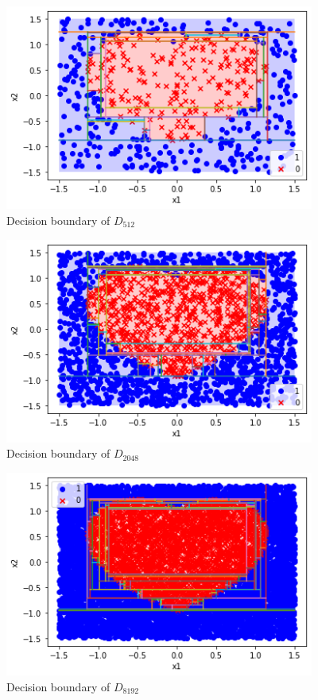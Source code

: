 \documentclass[a4paper]{article}
\theoremstyle{definition}
\begin{document}
\begin{figure}[htbp]
\centering
\includegraphics[width=4in]{Q7-3.png}
\caption{Decision boundary of $D_{512}$}
\label{Q7-3}
\end{figure}

\begin{figure}[htbp]
\centering
\includegraphics[width=4in]{Q7-4.png}
\caption{Decision boundary of $D_{2048}$}
\label{Q7-4}
\end{figure}

\begin{figure}[htbp]
\centering
\includegraphics[width=4in]{Q7-5.png}
\caption{Decision boundary of $D_{8192}$}
\label{Q7-5}
\end{figure}
\end{document}
